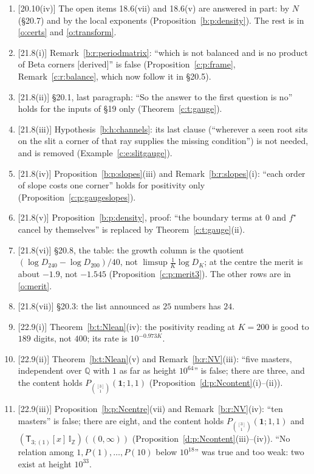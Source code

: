 \documentclass[11pt]{article}
\newcommand{\one}{\mathbf 1}
\newcommand{\sT}{\mathsf T}
\newcommand{\IZ}{\mathbb I_{\mathbb Z}}
\newcommand{\Tx}[3]{(\sT_{#1;(1)}[x]\,#2)((#3,\infty))}
\newcommand{\Pth}{P_{\binom{[3]}1}(\one;1,1)}
\newcommand{\Zt}{\Tx3{\IZ}0}
\theoremstyle{plain}
\theoremstyle{definition}
\theoremstyle{remark}
\newcommand{\derived}{\textup{[derived]}}
\begin{document}
\begin{enumerate}[label=\textbf{C\arabic*},ref=C\arabic*,leftmargin=*,itemsep=3pt]
\item {\small[20.10(iv)]} The open items 18.6(vii) and 18.6(v) are answered in part: by $N$ (\S20.7) and by the local exponents (Proposition~\ref{b:p:density}). The rest is in \ref{o:certs} and \ref{o:transform}.
\item {\small[21.8(i)]} Remark~\ref{b:r:periodmatrix}: ``which is not balanced and is no product of Beta corners \derived'' is false (Proposition~\ref{c:p:frame}, Remark~\ref{c:r:balance}, which now follow it in \S20.5).
\item {\small[21.8(ii)]} \S20.1, last paragraph: ``So the answer to the first question is no'' holds for the inputs of \S19 only (Theorem~\ref{c:t:gauge}).
\item {\small[21.8(iii)]} Hypothesis~\ref{b:h:channels}: its last clause (``wherever a seen root sits on the slit a corner of that ray supplies the missing condition'') is not needed, and is removed (Example~\ref{c:e:slitgauge}).
\item {\small[21.8(iv)]} Proposition~\ref{b:p:slopes}(iii) and Remark~\ref{b:r:slopes}(i): ``each order of slope costs one corner'' holds for positivity only (Proposition~\ref{c:p:gaugeslopes}).
\item {\small[21.8(v)]} Proposition~\ref{b:p:density}, proof: ``the boundary terms at $0$ and $f^\star$ cancel by themselves'' is replaced by Theorem~\ref{c:t:gauge}(ii).
\item {\small[21.8(vi)]} \S20.8, the table: the growth column is the quotient $(\log D_{240}-\log D_{200})/40$, not $\limsup\frac1K\log D_K$; at the centre the merit is about $-1.9$, not $-1.545$ (Proposition~\ref{c:p:merit3}). The other rows are in \ref{o:merit}.
\item {\small[21.8(vii)]} \S20.3: the list announced as $25$ numbers has $24$.
\item {\small[22.9(i)]} Theorem~\ref{b:t:Nlean}(iv): the positivity reading at $K=200$ is good to $189$ digits, not $400$; its rate is $10^{-0.973K}$.
\item {\small[22.9(ii)]} Theorem~\ref{b:t:Nlean}(v) and Remark~\ref{b:r:NV}(iii): ``five masters, independent over $\mathbb Q$ with $1$ as far as height $10^{64}$'' is false; there are three, and the content holds $\Pth$ (Proposition~\ref{d:p:Ncontent}(i)--(ii)).
\item {\small[22.9(iii)]} Proposition~\ref{b:p:Ncentre}(vii) and Remark~\ref{b:r:NV}(iv): ``ten masters'' is false; there are eight, and the content holds $\Pth$ and $\Zt$ (Proposition~\ref{d:p:Ncontent}(iii)--(iv)). ``No relation among $1,P(1),\dots,P(10)$ below $10^{18}$'' was true and too weak: two exist at height $10^{33}$.

\end{enumerate}
\end{document}
